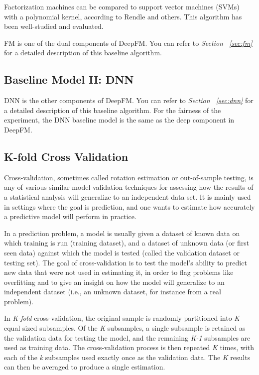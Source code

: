 \documentclass{article}
\begin{document}
    Factorization machines can be compared to support vector machines (SVMs) with a polynomial kernel, according to Rendle and others. This algorithm has been well-studied and evaluated.~\cite{rendle12:fm}

    FM is one of the dual components of DeepFM. You can refer to \emph{Section ~\ref{sec:fm}} for a detailed description of this baseline algorithm.

    \subsection{Baseline Model II: DNN}

    DNN is the other components of DeepFM. You can refer to \emph{Section ~\ref{sec:dnn}} for a detailed description of this baseline algorithm. For the fairness of the experiment, the DNN baseline model is the same as the deep component in DeepFM.

    \subsection{K-fold Cross Validation}

    Cross-validation, sometimes called rotation estimation or out-of-sample testing, is any of various similar model validation techniques for assessing how the results of a statistical analysis will generalize to an independent data set. It is mainly used in settings where the goal is prediction, and one wants to estimate how accurately a predictive model will perform in practice. 

    In a prediction problem, a model is usually given a dataset of known data on which training is run (training dataset), and a dataset of unknown data (or first seen data) against which the model is tested (called the validation dataset or testing set). The goal of cross-validation is to test the model’s ability to predict new data that were not used in estimating it, in order to flag problems like overfitting and to give an insight on how the model will generalize to an independent dataset (i.e., an unknown dataset, for instance from a real problem).~\cite{kohavi95:cv}

    In \emph{K-fold} cross-validation, the original sample is randomly partitioned into \emph{K} equal sized subsamples. Of the \emph{K} subsamples, a single subsample is retained as the validation data for testing the model, and the remaining \emph{K-1} subsamples are used as training data. The cross-validation process is then repeated \emph{K} times, with each of the \emph{k} subsamples used exactly once as the validation data. The \emph{K} results can then be averaged to produce a single estimation. 
\end{document}
